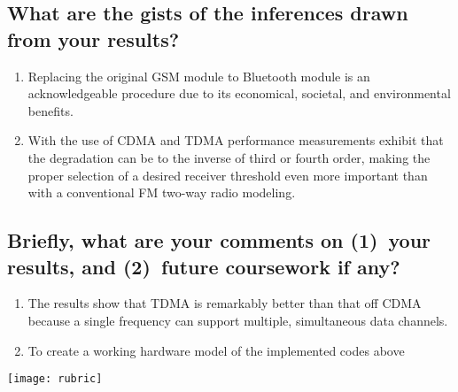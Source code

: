 \subsection{What are the gists of the inferences drawn from your results?}
\begin{enumerate}
	\item Replacing the original GSM module to Bluetooth module is an acknowledgeable procedure due to its economical, societal, and environmental benefits.
	\item With the use of CDMA and TDMA performance measurements exhibit that the degradation can be to the inverse of third or fourth order, making the proper selection of a desired receiver threshold even more important than with a conventional FM two-way radio modeling.
\end{enumerate}

\subsection{Briefly, what are your comments on (1)~your results, and  (2)~future coursework if any?}
\begin{enumerate}
	\item The results show that TDMA is remarkably better than that off CDMA because a single frequency can support multiple, simultaneous data channels.
	\item To create a working hardware model of the implemented codes above
\end{enumerate}	

\newpage



\newpage
\begin{figure*}[!t]
	\texttt{[image: rubric]} 
\end{figure*}
\cleardoublepage

